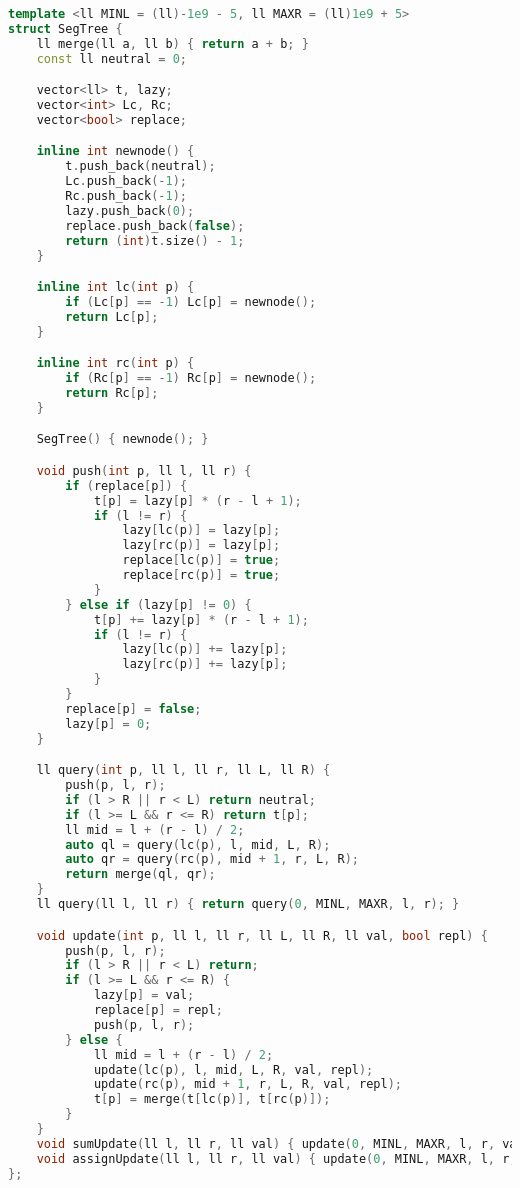 \documentclass[10pt, a4paper, oneside]{book}
\begin{document}
\begin{lstlisting}[language=C++]
template <ll MINL = (ll)-1e9 - 5, ll MAXR = (ll)1e9 + 5>
struct SegTree {
    ll merge(ll a, ll b) { return a + b; }
    const ll neutral = 0;

    vector<ll> t, lazy;
    vector<int> Lc, Rc;
    vector<bool> replace;

    inline int newnode() {
        t.push_back(neutral);
        Lc.push_back(-1);
        Rc.push_back(-1);
        lazy.push_back(0);
        replace.push_back(false);
        return (int)t.size() - 1;
    }

    inline int lc(int p) {
        if (Lc[p] == -1) Lc[p] = newnode();
        return Lc[p];
    }

    inline int rc(int p) {
        if (Rc[p] == -1) Rc[p] = newnode();
        return Rc[p];
    }

    SegTree() { newnode(); }

    void push(int p, ll l, ll r) {
        if (replace[p]) {
            t[p] = lazy[p] * (r - l + 1);
            if (l != r) {
                lazy[lc(p)] = lazy[p];
                lazy[rc(p)] = lazy[p];
                replace[lc(p)] = true;
                replace[rc(p)] = true;
            }
        } else if (lazy[p] != 0) {
            t[p] += lazy[p] * (r - l + 1);
            if (l != r) {
                lazy[lc(p)] += lazy[p];
                lazy[rc(p)] += lazy[p];
            }
        }
        replace[p] = false;
        lazy[p] = 0;
    }

    ll query(int p, ll l, ll r, ll L, ll R) {
        push(p, l, r);
        if (l > R || r < L) return neutral;
        if (l >= L && r <= R) return t[p];
        ll mid = l + (r - l) / 2;
        auto ql = query(lc(p), l, mid, L, R);
        auto qr = query(rc(p), mid + 1, r, L, R);
        return merge(ql, qr);
    }
    ll query(ll l, ll r) { return query(0, MINL, MAXR, l, r); }

    void update(int p, ll l, ll r, ll L, ll R, ll val, bool repl) {
        push(p, l, r);
        if (l > R || r < L) return;
        if (l >= L && r <= R) {
            lazy[p] = val;
            replace[p] = repl;
            push(p, l, r);
        } else {
            ll mid = l + (r - l) / 2;
            update(lc(p), l, mid, L, R, val, repl);
            update(rc(p), mid + 1, r, L, R, val, repl);
            t[p] = merge(t[lc(p)], t[rc(p)]);
        }
    }
    void sumUpdate(ll l, ll r, ll val) { update(0, MINL, MAXR, l, r, val, 0); }
    void assignUpdate(ll l, ll r, ll val) { update(0, MINL, MAXR, l, r, val, 1); }
};
\end{lstlisting}
\hfill
\end{document}
